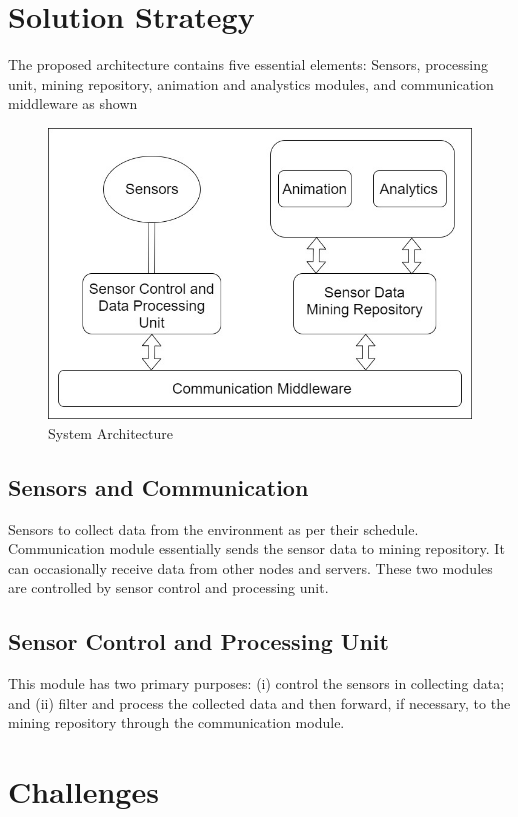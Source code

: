 \documentclass[10pt,a4paper]{report}
\begin{document}
\chapter{Solution Strategy}
The proposed architecture contains five essential elements: Sensors, processing unit, mining repository, animation and analystics modules, and communication middleware as shown
\begin{figure}[h!]
  \centering
  \hspace*{-1.25cm}   
\includegraphics[scale=0.34]{images/fig5.jpg}
  \hspace*{-1.25cm}
  \caption{System Architecture}
  \label{arch}
\end{figure}
\section{Sensors and Communication}
Sensors to collect data from the environment as per their schedule. Communication module essentially sends the sensor data to mining repository. It can occasionally receive data from other nodes and servers. These two modules are controlled by sensor control and processing unit.
\section{Sensor Control and Processing Unit}
This module has two primary purposes:
 (i) control the sensors in collecting data; and (ii) filter and process the collected data and then forward, if necessary, to the mining repository through the communication module.
\chapter{Challenges}
\end{document}
